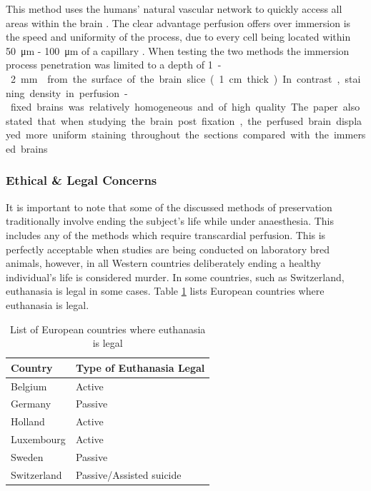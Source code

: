 \documentclass[a4paper, 11pt]{article}
\numberwithin{equation}{section}
\begin{document}
This method uses the humans' natural vascular network to quickly access all areas within the brain \cite{AnimalPerfusion65}. The clear advantage perfusion offers over immersion is the speed and uniformity of the process, due to every cell being located within \SI{50}{\micro\metre} - \SI{100}{\micro\metre} of a capillary \cite{BiologyoftheCell}. When testing the two methods the immersion process penetration was limited to a depth of \SI{1} - \SI{2}{\milli\metre} \cite{Beach1987183} from the surface of the brain slice (\SI{1}{\centi\metre} thick). In contrast, staining density in perfusion-fixed brains was relatively homogeneous and of high quality. The paper also stated that when studying the brain post fixation, the perfused brain displayed more uniform staining throughout the sections compared with the immersed brains \cite{Beach1987183}. 

\newpage

\clearpage

\pagestyle{judah}

\subsubsection{Ethical \& Legal Concerns}
\label{ethics}

It is important to note that some of the discussed methods of preservation traditionally involve ending the subject's life while under anaesthesia. This includes any of the methods which require transcardial perfusion. This is perfectly acceptable when studies are being conducted on laboratory bred animals, however, in all Western countries deliberately ending a healthy individual's life is considered murder. In some countries, such as Switzerland, euthanasia is legal in some cases. Table \ref{euthanasia_table} lists European countries where euthanasia is legal.

\begin{table}[H]
	\centering
	\begin{tabular}{|l|l|}
		\hline
		\textbf{Country} & \textbf{Type of Euthanasia Legal} \\ \hline
		Belgium & Active \\ \hline
		Germany & Passive \\ \hline
		Holland & Active \\ \hline
		Luxembourg & Active \\ \hline
		Sweden & Passive \\ \hline
		Switzerland & Passive/Assisted suicide \\ \hline
	\end{tabular}
	\caption{List of European countries where euthanasia is legal}
	\label{euthanasia_table}
\end{table}
\end{document}
